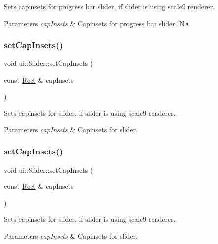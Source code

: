 Sets capinsets for progress bar slider, if slider is using scale9 renderer. 
\begin{DoxyParams}{Parameters}
{\em cap\+Insets} & Capinsets for progress bar slider.  NA \\
\hline
\end{DoxyParams}
\mbox{\label{classui_1_1Slider_a4b2b8f333375075f9b05f81f2195b52b}} 
\subsubsection{\texorpdfstring{set\+Cap\+Insets()}{setCapInsets()}\hspace{0.1cm}{\footnotesize\ttfamily [1/2]}}
{\footnotesize\ttfamily void ui\+::\+Slider\+::set\+Cap\+Insets (\begin{DoxyParamCaption}\item[{const \hyperlink{classRect}{Rect} \&}]{cap\+Insets }\end{DoxyParamCaption})}

Sets capinsets for slider, if slider is using scale9 renderer. 
\begin{DoxyParams}{Parameters}
{\em cap\+Insets} & Capinsets for slider. \\
\hline
\end{DoxyParams}
\mbox{\label{classui_1_1Slider_a4b2b8f333375075f9b05f81f2195b52b}} 
\subsubsection{\texorpdfstring{set\+Cap\+Insets()}{setCapInsets()}\hspace{0.1cm}{\footnotesize\ttfamily [2/2]}}
{\footnotesize\ttfamily void ui\+::\+Slider\+::set\+Cap\+Insets (\begin{DoxyParamCaption}\item[{const \hyperlink{classRect}{Rect} \&}]{cap\+Insets }\end{DoxyParamCaption})}

Sets capinsets for slider, if slider is using scale9 renderer. 
\begin{DoxyParams}{Parameters}
{\em cap\+Insets} & Capinsets for slider. \\
\hline
\end{DoxyParams}
\mbox{\label{classui_1_1Slider_ae0ee53b2a1e339478674a20004f3c26d}} 
